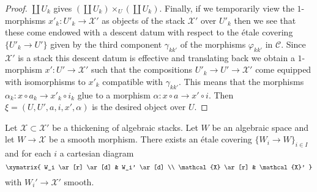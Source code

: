 \begin{proof}
$\coprod U_k$ gives $(\coprod U_k) \times_U (\coprod U_k)$.
Finally, if we temporarily view the $1$-morphisms
$x'_k : U'_k \to \mathcal{X}'$ as objects of the stack
$\mathcal{X}'$ over $U'_k$ then we see that these come endowed with a
descent datum with respect to the \'etale covering
$\{U'_k \to U'\}$ given by the third component $\gamma_{kk'}$
of the morphisms $\varphi_{kk'}$ in $\mathcal{C}$.
Since $\mathcal{X}'$ is a stack
this descent datum is effective and translating back we obtain
a $1$-morphism $x' : U' \to \mathcal{X}'$ such that the compositions
$U'_k \to U' \to \mathcal{X}'$ come equipped with isomorphisms to $x'_k$
compatible with $\gamma_{kk'}$. This means that the morphisms
$\alpha_k : x \circ a_k \to x'_k \circ i_k$ glue to a morphism
$\alpha : x \circ a \to x' \circ i$. Then $\xi = (U, U', a, i, x', \alpha)$
is the desired object over $U$.
\end{proof}

\begin{lemma}
\label{lemma-etale-local-lifts}
Let $\mathcal{X} \subset \mathcal{X}'$ be a thickening of algebraic stacks.
Let $W$ be an algebraic space and let $W \to \mathcal{X}$ be a smooth morphism.
There exists an \'etale covering $\{W_i \to W\}_{i \in I}$ and for each $i$
a cartesian diagram
$$
\xymatrix{
W_i \ar[r] \ar[d] & W_i' \ar[d] \\
\mathcal{X} \ar[r] & \mathcal{X}'
}
$$
with $W_i' \to \mathcal{X}'$ smooth.
\end{lemma}


